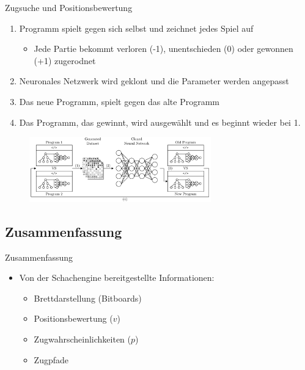 \begin{frame}{Zugsuche und Positionsbewertung}
\begin{enumerate}
	\item Programm spielt gegen sich selbst und zeichnet jedes Spiel auf
	\begin{itemize}
		\item Jede Partie bekommt verloren (-1), unentschieden (0) oder gewonnen (+1) zugerodnet
	\end{itemize}
	\item Neuronales Netzwerk wird geklont und die Parameter werden angepasst
	\item Das neue Programm, spielt gegen das alte Programm
	\item Das Programm, das gewinnt, wird ausgewählt und es beginnt wieder bei 1.
\end{enumerate}
\begin{figure}
\centering
\includegraphics[width=0.7\textwidth]{graphics/alphazero/selfplay.png}
\end{figure}
\end{frame}

\subsection{Zusammenfassung}

\begin{frame}{Zusammenfassung}
\begin{itemize}
	\item Von der Schachengine bereitgestellte Informationen:
	\begin{itemize}
		\item Brettdarstellung (Bitboards)
		\item Positionsbewertung ($v$)
		\item Zugwahrscheinlichkeiten ($p$)
		\item Zugpfade
\end{itemize}
\end{itemize}
\end{frame}
